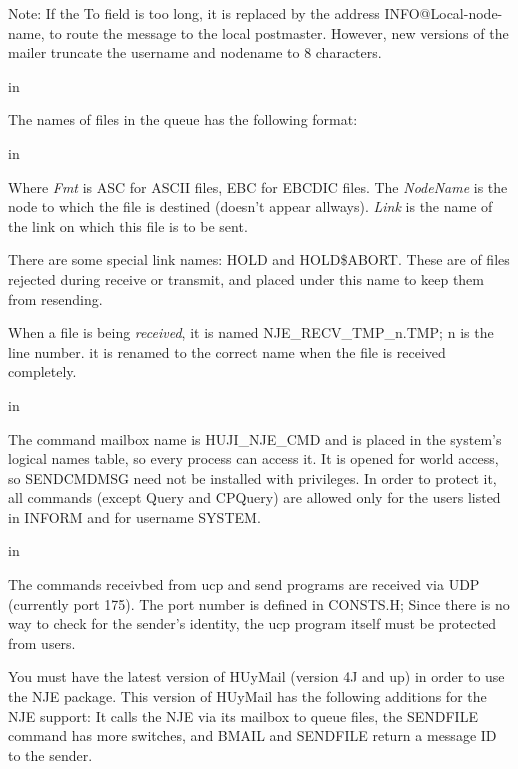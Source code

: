 {\ncrBold Note}: If the To field is too long, it is replaced by the address
INFO@Local-node-name,  to  route  the  message  to the local postmaster.
However, new versions of the mailer truncate the username  and  nodename
to 8 characters.

 in

The names of files in the queue has the following format:

 in 

Where  {\sl Fmt} is {\ncrBold ASC} for ASCII files, {\ncrBold EBC}
 for EBCDIC files. The {\sl NodeName} is
the node to which the file is destined (doesn't appear allways). {\sl Link} is
the name of the link on which this file is to be sent.

There  are some special link names: {\ncrBold HOLD} and
{\ncrBold HOLD\$ABORT}. These are of
files rejected during receive or transmit, and placed under this name to
keep them from resending.

When  a  file is being {\sl received}, it is named
{\ncrBold NJE\_RECV\_TMP\_n.TMP;} n is
the line number. it is renamed to the correct  name  when  the  file  is
received completely.

 in

The command mailbox name is {\ncrBold HUJI\_NJE\_CMD} and is placed in the
system's logical names table, so every process  can  access  it.  It  is
opened  for  world  access,  so  SENDCMDMSG  need  not be installed with
privileges. In order to protect  it,  all  commands  (except  Query  and
CPQuery)  are  allowed  only  for  the  users  listed  in INFORM and for
username SYSTEM.

 in

The commands receivbed from ucp and send programs  are  received  via
UDP  (currently port 175). The port number is defined in CONSTS.H; Since
there is no way to check for the sender's identity, the {\ncrBold ucp} program
itself must be protected from users.
\vfill\eject


You  must  have  the latest version of HUyMail (version 4J and up) in
order to use the NJE package. This version of HUyMail has the  following
additions for the NJE support: It calls the NJE via its mailbox to queue
files, the SENDFILE command has more switches, and  BMAIL  and  SENDFILE
return a message ID to the sender.

